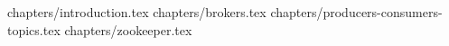 \documentclass[a4paper,12pt]{article}
\begin{document}
 
 
 

\tableofcontents
\clearpage

{chapters/introduction.tex}
{chapters/brokers.tex}
{chapters/producers-consumers-topics.tex}
{chapters/zookeeper.tex}
 


\end{document}
